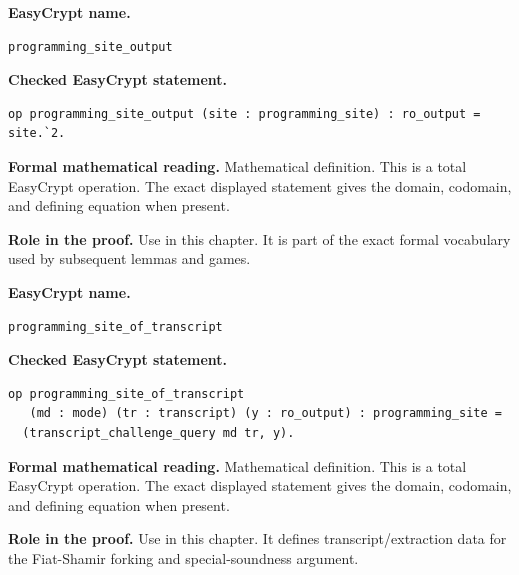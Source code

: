\begin{formaldefinition}
\noindent\textbf{EasyCrypt name.}
\begin{lstlisting}[language=EasyCrypt,basicstyle=\ttfamily\scriptsize]
programming_site_output
\end{lstlisting}
\noindent\textbf{Checked EasyCrypt statement.}
\begin{lstlisting}[language=EasyCrypt,basicstyle=\ttfamily\scriptsize]
op programming_site_output (site : programming_site) : ro_output = site.`2.
\end{lstlisting}
\noindent\textbf{Formal mathematical reading.}
Mathematical definition. This is a total EasyCrypt operation.  The exact displayed statement gives the domain, codomain, and defining equation when present.

\noindent\textbf{Role in the proof.}
Use in this chapter. It is part of the exact formal vocabulary used by subsequent lemmas and games.

\end{formaldefinition}

\begin{formaldefinition}
\noindent\textbf{EasyCrypt name.}
\begin{lstlisting}[language=EasyCrypt,basicstyle=\ttfamily\scriptsize]
programming_site_of_transcript
\end{lstlisting}
\noindent\textbf{Checked EasyCrypt statement.}
\begin{lstlisting}[language=EasyCrypt,basicstyle=\ttfamily\scriptsize]
op programming_site_of_transcript
   (md : mode) (tr : transcript) (y : ro_output) : programming_site =
  (transcript_challenge_query md tr, y).
\end{lstlisting}
\noindent\textbf{Formal mathematical reading.}
Mathematical definition. This is a total EasyCrypt operation.  The exact displayed statement gives the domain, codomain, and defining equation when present.

\noindent\textbf{Role in the proof.}
Use in this chapter. It defines transcript/extraction data for the Fiat-Shamir forking and special-soundness argument.

\end{formaldefinition}

